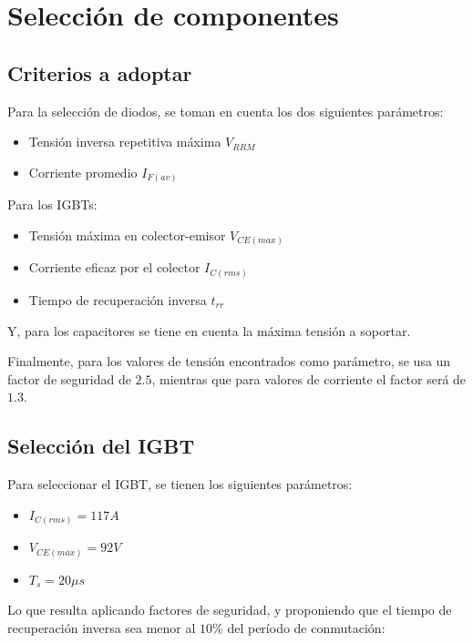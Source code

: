 \clearpage

\section{Selección de componentes}

\subsection{Criterios a adoptar}

Para la selección de diodos, se toman en cuenta los dos siguientes parámetros:

\begin{itemize}
	\item Tensión inversa repetitiva máxima $V_{RRM}$
	\item Corriente promedio $I_{F(av)}$
\end{itemize}

Para los IGBTs:

\begin{itemize}
	\item Tensión máxima en colector-emisor $V_{CE(max)}$
	\item Corriente eficaz por el colector $I_{C(rms)}$
	\item Tiempo de recuperación inversa $t_{rr}$
\end{itemize}

Y, para los capacitores se tiene en cuenta la máxima tensión a soportar.

Finalmente, para los valores de tensión encontrados como parámetro, se usa un factor de seguridad de $2.5$, mientras que para valores de corriente el factor será de $1.3$.

\subsection{Selección del IGBT}

Para seleccionar el IGBT, se tienen los siguientes parámetros:

\begin{itemize}
	\item $I_{C(rms)}=117 A$
	\item $V_{CE(max)} = 92 V$
	\item $T_s=20\mu s$
\end{itemize}

Lo que resulta aplicando factores de seguridad, y proponiendo que el tiempo de recuperación inversa sea menor al $10\%$ del período de conmutación:

